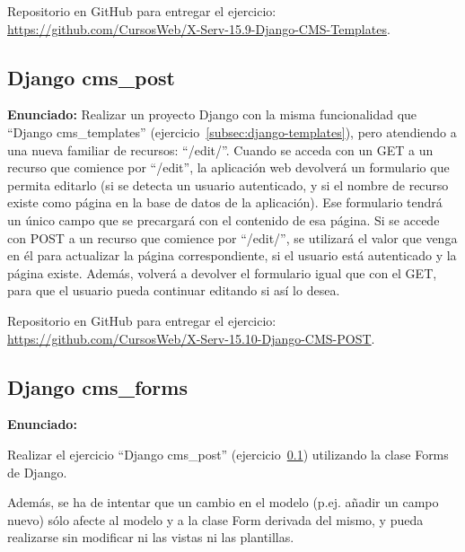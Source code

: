 Repositorio en GitHub para entregar el ejercicio: \\ 
\url{https://github.com/CursosWeb/X-Serv-15.9-Django-CMS-Templates}.

\subsection{Django cms\_post}
\label{subsec:django-post}

\textbf{Enunciado:}
 Realizar un proyecto Django con la misma funcionalidad que ``Django cms\_templates'' (ejercicio~\ref{subsec:django-templates}), pero atendiendo a una nueva familiar de recursos: ``/edit/''. Cuando se acceda con un GET a un recurso que comience por ``/edit'', la aplicación web devolverá un formulario que permita editarlo (si se detecta un usuario autenticado, y si el nombre de recurso existe como página en la base de datos de la aplicación). Ese formulario tendrá un único campo que se precargará con el contenido de esa página. Si se accede con POST a un recurso que comience por ``/edit/'', se utilizará el valor que venga en él para actualizar la página correspondiente, si el usuario está autenticado y la página existe. Además, volverá a devolver el formulario igual que con el GET, para que el usuario pueda continuar editando si así lo desea.
 
Repositorio en GitHub para entregar el ejercicio: \\
\url{https://github.com/CursosWeb/X-Serv-15.10-Django-CMS-POST}.

\subsection{Django cms\_forms}
\label{subsec:django-forms}

\textbf{Enunciado:}

Realizar el ejercicio ``Django cms\_post'' (ejercicio~\ref{subsec:django-post}) utilizando la clase Forms de Django. 

Además, se ha de intentar que un cambio en el modelo (p.ej. añadir un campo nuevo) sólo afecte al modelo y a la clase Form derivada del mismo, y pueda realizarse sin modificar ni las vistas ni las plantillas.

